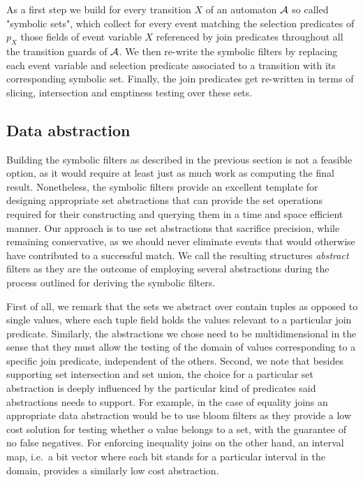 As a first step we build for every transition $X$ of an automaton $\mathcal{A}$ so 
called "symbolic sets", which collect for every event matching the selection 
predicates of $p_X$ those fields of event variable $X$ referenced by join 
predicates throughout all the transition guards of $\mathcal{A}$.
We then re-write the symbolic filters by replacing each event variable and 
selection predicate associated to a transition with its corresponding symbolic 
set.
Finally, the join predicates get re-written in terms of slicing, intersection 
and emptiness testing over these sets.


\subsection{Data abstraction}
\label{sec:data_abstraction}


Building the symbolic filters as described in the previous section is not a 
feasible option, as it would require at least just as much work as computing 
the final result.
Nonetheless, the symbolic filters provide an excellent template for designing 
appropriate set abstractions that can provide the set operations required for 
their constructing and querying them in a time and space efficient manner. 
Our approach is to use set abstractions that sacrifice precision, while 
remaining conservative, as we should never eliminate events that would 
otherwise have contributed to a successful match.
We call the resulting structures {\em abstract} filters as they are the outcome 
of employing several abstractions during the process outlined for deriving the 
symbolic filters.  


First of all, we remark that the sets we abstract over contain tuples as 
opposed to single values, where each tuple field holds the values relevant to a 
particular join predicate. 
Similarly, the abstractions we chose need to be multidimensional in the sense 
that they must allow the testing of the domain of values corresponding to a 
specific join predicate, independent of the others.  
Second, we note that besides supporting set intersection and set union, the 
choice for a particular set abstraction is deeply influenced by the particular 
kind of predicates said abstractions needs to support.
For example, in the case of equality joins an appropriate data abstraction 
would be to use bloom filters as they provide a low cost solution for testing 
whether o value belongs to a set, with the guarantee of no false negatives.
For enforcing inequality joins on the other hand, an interval map, i.e.\ a 
bit vector where each bit stands for a particular interval in the domain,
provides a similarly low cost abstraction.  





